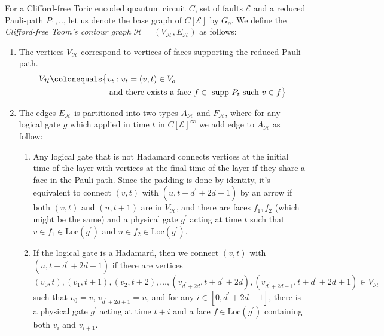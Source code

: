 \begin{definition}
    For a Clifford-free Toric encoded quantum circuit $C$, set of faults $\mathcal{E}$ and a reduced Pauli-path $P_{1},..$, let us denote the base graph of $C[\mathcal{E}]$ by $G_{o}$. We define the \textit{Clifford-free Toom's contour graph} $\mathcal{H} = ( V_{\mathcal{H}}, E_{\mathcal{H}})$ as follows: 
    \begin{enumerate}
      \item The vertices $V_{\mathcal{H}}$ correspond to vertices of faces supporting the reduced Pauli-path. 
        \begin{equation*}
          \begin{split}
            V_{\mathcal{H}} \colonequals & \big\{ v_{t} : v_{t}=(v,t) \in V_{o} \\
            & \, \, \, \text{ and there exists a face } f \in \text{ supp } P_{t} \text{ such } v \in f \big\} \\
          \end{split}
        \end{equation*}
      \item The edges $E_{\mathcal{H}}$ is partitioned into two types $A_{\mathcal{H}}$ and $F_{\mathcal{H}}$, where for any logical gate $g$ which applied in time $t$ in $C[\mathcal{E}]^{\infty} $ we add edge to $A_{\mathcal{H}}$ as follow: 
        \begin{enumerate}
    \item Any logical gate that is not Hadamard connects vertices at the initial time of the layer with vertices at the final time of the layer if they share a face in the Pauli-path. Since the padding is done by identity, it's equivalent to connect $(v,t)$ with $(u,t+d^{\prime}+2d+1)$ by an arrow if both $(v,t)$ and $(u,t+1)$ are in $V_{\mathcal{H}}$, and there are faces $f_{1}, f_{2}$ (which might be the same) and a physical gate $g^{\prime}$ acting at time $t$ such that $v \in f_{1} \in \text{Loc}(g^{\prime})$ and $u \in f_{2} \in \text{Loc}(g^{\prime})$.
    \item If the logical gate is a Hadamard, then we connect $(v,t)$ with $(u,t+d^{\prime}+2d+1)$ if there are vertices $(v_{0},t),(v_{1},t+1),(v_{2},t+2),\ldots,(v_{d^{\prime}+2d},t+d^{\prime}+2d),(v_{d^{\prime}+2d+1},t+d^{\prime}+2d+1) \in V_{\mathcal{H}}$ such that $v_{0}=v$, $v_{d^{\prime}+2d+1}=u$, and for any $i \in [0, d^{\prime}+2d+1]$, there is a physical gate $g^{\prime}$ acting at time $t + i$ and a face $f \in \text{Loc}(g^{\prime})$ containing both $v_{i}$ and $v_{i+1}$.

\end{enumerate}
\end{enumerate}
\end{definition}

